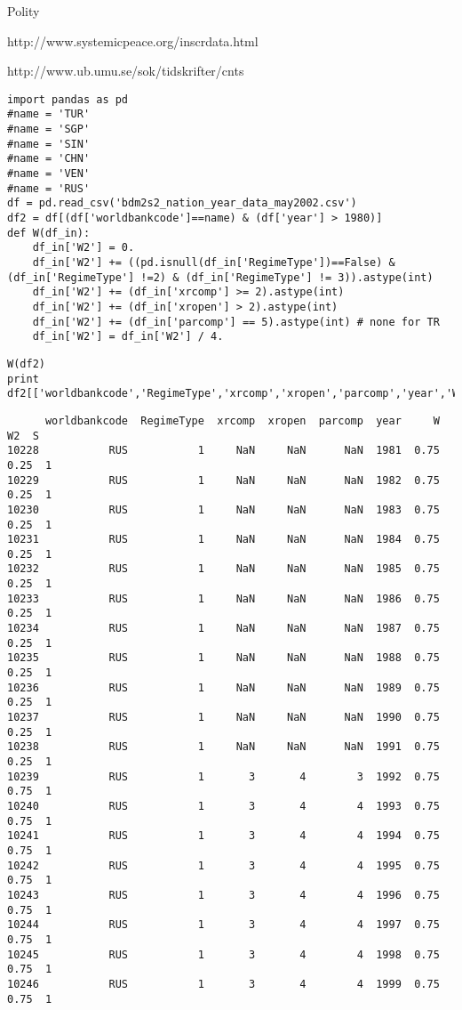 \documentclass[12pt,fleqn]{article}\usepackage{common}
\begin{document}
Polity

http://www.systemicpeace.org/inscrdata.html

http://www.ub.umu.se/sok/tidskrifter/cnts

\begin{verbatim}
import pandas as pd
#name = 'TUR'
#name = 'SGP'
#name = 'SIN'
#name = 'CHN'
#name = 'VEN'
#name = 'RUS'
df = pd.read_csv('bdm2s2_nation_year_data_may2002.csv')
df2 = df[(df['worldbankcode']==name) & (df['year'] > 1980)]
def W(df_in):
    df_in['W2'] = 0.
    df_in['W2'] += ((pd.isnull(df_in['RegimeType'])==False) & (df_in['RegimeType'] !=2) & (df_in['RegimeType'] != 3)).astype(int)
    df_in['W2'] += (df_in['xrcomp'] >= 2).astype(int)
    df_in['W2'] += (df_in['xropen'] > 2).astype(int)
    df_in['W2'] += (df_in['parcomp'] == 5).astype(int) # none for TR
    df_in['W2'] = df_in['W2'] / 4.
\end{verbatim}

\begin{verbatim}
W(df2)
print df2[['worldbankcode','RegimeType','xrcomp','xropen','parcomp','year','W','W2','S']]
\end{verbatim}

\begin{verbatim}
      worldbankcode  RegimeType  xrcomp  xropen  parcomp  year     W    W2  S
10228           RUS           1     NaN     NaN      NaN  1981  0.75  0.25  1
10229           RUS           1     NaN     NaN      NaN  1982  0.75  0.25  1
10230           RUS           1     NaN     NaN      NaN  1983  0.75  0.25  1
10231           RUS           1     NaN     NaN      NaN  1984  0.75  0.25  1
10232           RUS           1     NaN     NaN      NaN  1985  0.75  0.25  1
10233           RUS           1     NaN     NaN      NaN  1986  0.75  0.25  1
10234           RUS           1     NaN     NaN      NaN  1987  0.75  0.25  1
10235           RUS           1     NaN     NaN      NaN  1988  0.75  0.25  1
10236           RUS           1     NaN     NaN      NaN  1989  0.75  0.25  1
10237           RUS           1     NaN     NaN      NaN  1990  0.75  0.25  1
10238           RUS           1     NaN     NaN      NaN  1991  0.75  0.25  1
10239           RUS           1       3       4        3  1992  0.75  0.75  1
10240           RUS           1       3       4        4  1993  0.75  0.75  1
10241           RUS           1       3       4        4  1994  0.75  0.75  1
10242           RUS           1       3       4        4  1995  0.75  0.75  1
10243           RUS           1       3       4        4  1996  0.75  0.75  1
10244           RUS           1       3       4        4  1997  0.75  0.75  1
10245           RUS           1       3       4        4  1998  0.75  0.75  1
10246           RUS           1       3       4        4  1999  0.75  0.75  1
\end{verbatim}
\end{document}
